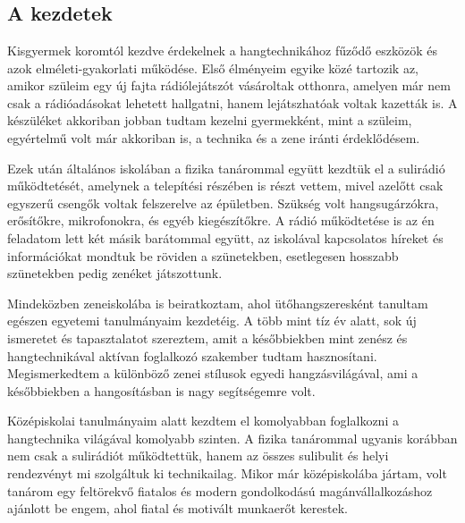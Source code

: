 \chapter{\bevezetes}

\section{A kezdetek}

Kisgyermek koromtól kezdve érdekelnek a hangtechnikához fűződő eszközök és azok elméleti-gyakorlati működése. Első élményeim egyike közé tartozik az, amikor
szüleim egy új fajta rádiólejátszót vásároltak otthonra, amelyen már nem csak a rádióadásokat lehetett hallgatni, hanem lejátszhatóak voltak kazetták is.
A készüléket akkoriban jobban tudtam kezelni gyermekként, mint a szüleim, egyértelmű volt már akkoriban is, a technika és a zene iránti érdeklődésem. 

Ezek után általános iskolában a fizika tanárommal együtt kezdtük el a sulirádió működtetését, amelynek a telepítési részében is részt vettem, mivel azelőtt
csak egyszerű csengők voltak felszerelve az épületben. Szükség volt hangsugárzókra, erősítőkre, mikrofonokra, és egyéb kiegészítőkre. A rádió működtetése
is az én feladatom lett két másik barátommal együtt, az iskolával kapcsolatos híreket és információkat mondtuk be röviden a szünetekben, esetlegesen hosszabb szünetekben pedig zenéket játszottunk.

Mindeközben zeneiskolába is beiratkoztam, ahol ütőhangszeresként tanultam egészen egyetemi tanulmányaim kezdetéig. A több mint tíz év alatt, sok új ismeretet és tapasztalatot szereztem,
amit a későbbiekben mint zenész és hangtechnikával aktívan foglalkozó szakember tudtam hasznosítani. Megismerkedtem a különböző zenei stílusok egyedi hangzásvilágával, ami a későbbiekben a hangosításban is nagy segítségemre volt.

Középiskolai tanulmányaim alatt kezdtem el komolyabban foglalkozni a hangtechnika világával komolyabb szinten. 
A fizika tanárommal ugyanis korábban nem csak a sulirádiót működtettük, hanem az összes sulibulit és helyi rendezvényt mi szolgáltuk ki technikailag.
Mikor már középiskolába jártam, volt tanárom egy feltörekvő fiatalos és modern gondolkodású magánvállalkozáshoz ajánlott be engem, ahol fiatal és motivált munkaerőt kerestek.

